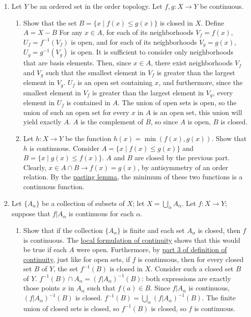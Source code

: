 \documentclass[12pt,letterpaper]{article}
\begin{document}
\begin{enumerate}
\begin{enumerate}
  \end{enumerate}
  \item Let $Y$ be an ordered set in the order topology. Let $f,g: X\rightarrow Y$ be continuous.
  \begin{enumerate}
    \item Show that the set $B=\{x\;|\; f(x)\leq g(x)\}$ is closed in $X$.\hspace{5in}\n
    \indent Define $A=X-B$ For any $x\in A$, for each of its neighborhoods $V_f=f(x)$, $U_f=f^{-1}(V_f)$ is open, and for each of its neighborhoods $V_g=g(x)$, $U_g=g^{-1}(V_g)$ is open. It is sufficient to consider only neighborhoods that are basis elements. Then, since $x\in A$, there exist neighborhoods $V_f$ and $V_g$ such that the smallest element in $V_f$ is greater than the largest element in $V_g$. $U_f$ is an open set containing $x$, and furthermore, since the smallest element in $V_f$ is greater than the largest element in $V_g$, every element in $U_f$ is contained in $A$. The union of open sets is open, so the union of such an open set for every $x$ in $A$ is an open set, this union will yield exactly $A$. $A$ is the complement of $B$, so since $A$ is open, $B$ is closed.
    \item Let $h: X\rightarrow Y$ be the function $h(x)=\min(f(x),g(x))$. Show that $h$ is continuous.\hspace{5in}\n
    \indent Consider $A=\{x\;|\; f(x)\leq g(x)\}$ and $B=\{x\;|\; g(x)\leq f(x)\}$. $A$ and $B$ are closed by the previous part. Clearly, $x\in A\cap B\rightarrow f(x)=g(x)$, by antisymmetry of an order relation. By the \hyperref[thm:PastingLemma]{pasting lemma}, the minimum of these two functions is a continuous function. \n
  \end{enumerate}
  \item Let $\{A_\alpha\}$ be a collection of subsets of $X$; let $X=\bigcup_\alpha A_\alpha$. Let $f: X\rightarrow Y$; suppose that $f|A_\alpha$ is continuous for each $\alpha$. 
  \begin{enumerate}
    \item Show that if the collection $\{A_\alpha\}$ is finite and each set $A_\alpha$ is closed, then $f$ is continuous.\hspace{5in}\n
    \indent The \hyperref[thm:LocalFormulationContinuity]{local formulation of continuity} shows that this would be true if each $A$ were open. Furthermore, by \hyperref[dfn:continuous3]{part 3 of definition of continuity}, just like for open sets, if $f$ is continuous, then for every closed set $B$ of $Y$, the set $f^{-1}(B)$ is closed in $X$. Consider such a closed set $B$ of $Y$. $f^{-1}(B)\cap A_\alpha = (f|A_\alpha)^{-1}(B)$: both expressions are exactly those points $x$ in $A_\alpha$ such that $f(a)\in B$. Since $f|A_\alpha$ is continuous, $(f|A_\alpha)^{-1}(B)$ is closed. $f^{-1}(B) = \bigcup_\alpha(f|A_\alpha)^{-1}(B)$. The finite union of closed sets is closed, so $f^{-1}(B)$ is closed, so $f$ is continuous.

\end{enumerate}
\end{enumerate}
\end{document}
